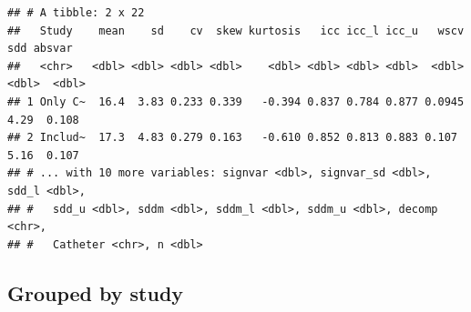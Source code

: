 \documentclass[
]{article}
\begin{document}
\begin{verbatim}
## # A tibble: 2 x 22
##   Study    mean    sd    cv  skew kurtosis   icc icc_l icc_u   wscv   sdd absvar
##   <chr>   <dbl> <dbl> <dbl> <dbl>    <dbl> <dbl> <dbl> <dbl>  <dbl> <dbl>  <dbl>
## 1 Only C~  16.4  3.83 0.233 0.339   -0.394 0.837 0.784 0.877 0.0945  4.29  0.108
## 2 Includ~  17.3  4.83 0.279 0.163   -0.610 0.852 0.813 0.883 0.107   5.16  0.107
## # ... with 10 more variables: signvar <dbl>, signvar_sd <dbl>, sdd_l <dbl>,
## #   sdd_u <dbl>, sddm <dbl>, sddm_l <dbl>, sddm_u <dbl>, decomp <chr>,
## #   Catheter <chr>, n <dbl>
\end{verbatim}

\hypertarget{grouped-by-study}{%
\subsection{Grouped by study}\label{grouped-by-study}}
\end{document}

